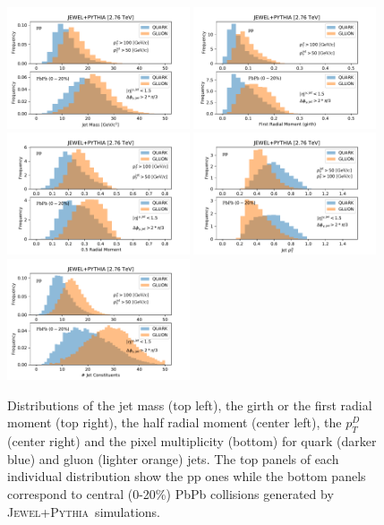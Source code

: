 \documentclass[notoc]{JHEP3}
\newcommand{\jwpy}{\textsc{Jewel+Pythia}~}
\begin{document}
\begin{figure}[h]
	   \centering
	   \includegraphics[width=0.48\textwidth]{plots/JEWEL_pp_pbpb020_jetMass}
	   \includegraphics[width=0.48\textwidth]{plots/JEWEL_pp_pbpb020_firstRadialMoment}
	   \includegraphics[width=0.48\textwidth]{plots/JEWEL_pp_pbpb020_halfRadialMoment}
	   \includegraphics[width=0.48\textwidth]{plots/JEWEL_pp_pbpb020_pTD}
	   \includegraphics[width=0.48\textwidth]{plots/JEWEL_pp_pbpb020_NumberjetConstituents}
	   \caption{Distributions of the jet mass (top left), the girth or the first radial moment (top right), the half radial moment (center left), the $p^{D}_{T}$ (center right) and the pixel multiplicity (bottom) for quark (darker blue) and gluon (lighter orange) jets. The top panels of each individual distribution show the pp ones while the bottom panels correspond to central (0-20\%) PbPb collisions generated by \jwpy simulations.}
	   \label{fig:jetdistributons_pp_pbpb}
	\end{figure}
\end{document}
